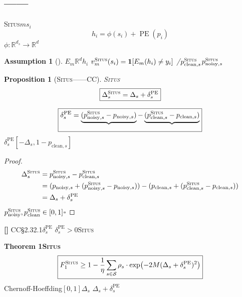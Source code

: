 \documentclass[11pt,a4paper]{article}
\newtheorem{proposition}[theorem]{Proposition}
\newtheorem{assumption}[theorem]{Assumption}
\theoremstyle{remark}
\DeclareMathOperator{\PE}{PE}
\newcommand{\R}{\mathbb{R}}
\newcommand{\Sstates}{\mathcal{S}}
\newcommand{\Situs}{\textsc{Situs}}
\newcommand{\rigorous}{\textnormal{\textbf{[]}}}
\begin{document}
\subsection{——}

\Situs{}$m$$s_i$
\begin{equation}
    h_i = \phi(s_i) + \PE(p_i)
\end{equation}
$\phi: \R^{d_s} \to \R^d$

\begin{assumption}[]
\label{ass:2.1.1}
$E_m$$\R^d$$h_i$
$v_m^{\Situs}(s_i) = \mathbf{1}[E_m(h_i) \neq y_i]$
/$p_{\text{clean}, s}^{\Situs}$$p_{\text{noisy}, s}^{\Situs}$
\end{assumption}

\begin{proposition}[\Situs{}——CC]
\label{prop:2.1}
\Situs{}
\begin{equation}
    \boxed{
    \Delta_s^{\Situs} = \Delta_s + \delta_s^{\PE}
    }
\end{equation}

\begin{equation}
    \boxed{
    \delta_s^{\PE} = \underbrace{(p_{\text{noisy}, s}^{\Situs} - p_{\text{noisy}, s})}_{
    \text{}}
    - \underbrace{(p_{\text{clean}, s}^{\Situs} - p_{\text{clean}, s})}_{
    \text{}}
    }
\end{equation}
$\delta_s^{\PE}$$[-\Delta_s, 1 - p_{\text{clean}, s}]$
\end{proposition}

\begin{proof}

\begin{align}
    \Delta_s^{\Situs} &= p_{\text{noisy}, s}^{\Situs} - p_{\text{clean}, s}^{\Situs} \nonumber\\
    &= (p_{\text{noisy}, s} + (p_{\text{noisy}, s}^{\Situs} - p_{\text{noisy}, s}))
     - (p_{\text{clean}, s} + (p_{\text{clean}, s}^{\Situs} - p_{\text{clean}, s})) \nonumber\\
    &= \Delta_s + \delta_s^{\PE}
\end{align}
$p_{\text{noisy}}^{\Situs}, p_{\text{clean}}^{\Situs} \in [0,1]$\hfill $\square$
\end{proof}

\rigorous{} \textbf{}CC\S2.32.1$\delta_s^{\PE}$
\textbf{}$\delta_s^{\PE} > 0$\Situs{}


\textbf{Theorem 1\Situs{}}
\begin{equation}
    \boxed{
    F_1^{\Situs} \geq 1 - \frac{1}{\eta} \sum_{s \in \Sstates} \rho_s \cdot
    \exp\!\left(-2M (\Delta_s + \delta_s^{\PE})^2\right)
    }
\end{equation}
Chernoff-Hoeffding$[0,1]$$\Delta_s$
$\Delta_s + \delta_s^{\PE}$
\end{document}

